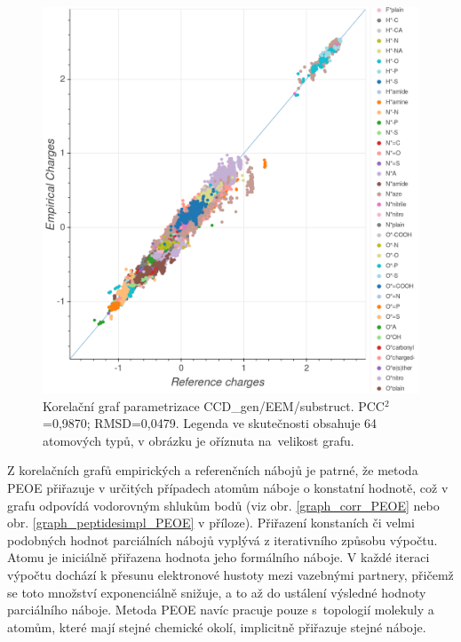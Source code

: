 \begin{figure}[H]
\begin{center}
\includegraphics[width=13cm]{pictures/graph_correlation_SDF_EEM_substruct.png}
\caption{Korelační graf parametrizace CCD\_gen/EEM/substruct.  PCC$^2$=0,9870; RMSD=0,0479. Legenda ve skutečnosti obsahuje 64 atomových typů, v obrázku je oříznuta na~velikost grafu.}
\label{graph_corr_EEM}
\end{center}
\end{figure}
\newpage

Z korelačních grafů empirických a referenčních nábojů je patrné, že metoda PEOE přiřazuje v určitých případech atomům náboje o konstatní hodnotě, což v grafu odpovídá vodorovným shlukům bodů (viz obr. \ref{graph_corr_PEOE} nebo obr. \ref{graph_peptidesimpl_PEOE} v příloze). Přiřazení konstaních či velmi podobných hodnot parciálních nábojů vyplývá z iterativního způsobu výpočtu. Atomu je iniciálně přiřazena hodnota jeho formálního náboje. V každé iteraci výpočtu dochází k přesunu elektronové hustoty mezi vazebnými partnery, přičemž se toto množství exponenciálně snižuje, a to až do ustálení výsledné hodnoty parciálního náboje. Metoda PEOE navíc pracuje pouze s~topologií molekuly a atomům, které mají stejné chemické okolí, implicitně přiřazuje stejné náboje.

